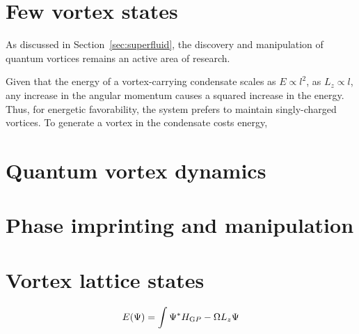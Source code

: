 \section{Few vortex states}
As discussed in Section~\ref{sec:superfluid}, the discovery and manipulation of quantum vortices remains an active area of research.



Given that the energy of a vortex-carrying condensate scales as $E\propto l^2$, as $L_z \propto l$, any increase in the angular momentum causes a squared increase in the energy. Thus, for energetic favorability, the system prefers to maintain singly-charged vortices. To generate a vortex in the condensate costs energy,



\section{Quantum vortex dynamics}


\section{Phase imprinting and manipulation}

\section{Vortex lattice states}
    \begin{equation}
        E(\Psi) = \int \Psi^{*} H_{\text GP} -\Omega L_z \Psi
    \end{equation}
